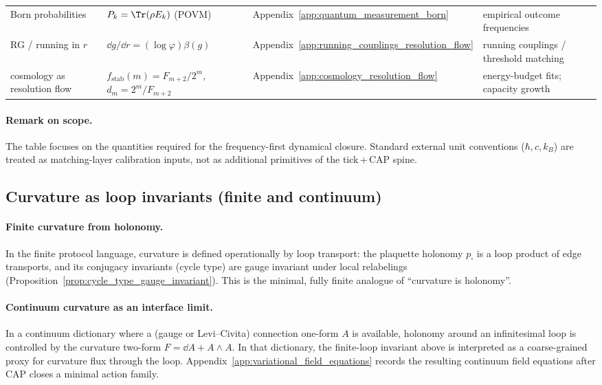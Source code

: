 \begin{longtable}{p{} p{} p{} p{}}
Born probabilities & $P_k=\Tr(\rho E_k)$ (POVM) & Appendix~\ref{app:quantum_measurement_born} & empirical outcome frequencies \\
RG / running in $r$ & $\dd g/\dd r=(\log\varphi)\beta(g)$ & Appendix~\ref{app:running_couplings_resolution_flow} & running couplings / threshold matching \\
cosmology as resolution flow & $f_{\mathrm{stab}}(m)=F_{m+2}/2^m$, $d_m=2^m/F_{m+2}$ & Appendix~\ref{app:cosmology_resolution_flow} & energy-budget fits; capacity growth \\
\bottomrule
\end{longtable}

\paragraph{Remark on scope.}
\AuditTag The table focuses on the quantities required for the frequency-first dynamical closure.
Standard external unit conventions ($\hbar,c,k_B$) are treated as matching-layer calibration inputs, not as additional primitives of the tick\,+\,CAP spine.

\subsection{Curvature as loop invariants (finite and continuum)}
\label{subsec:curvature_as_loops}

\paragraph{Finite curvature from holonomy.}
\MathTag In the finite protocol language, curvature is defined operationally by loop transport:
the plaquette holonomy $p_\square$ is a loop product of edge transports, and its conjugacy invariants (cycle type) are gauge invariant under local relabelings (Proposition~\ref{prop:cycle_type_gauge_invariant}).
This is the minimal, fully finite analogue of ``curvature is holonomy''.

\paragraph{Continuum curvature as an interface limit.}
\InterfaceTag In a continuum dictionary where a (gauge or Levi--Civita) connection one-form $A$ is available,
holonomy around an infinitesimal loop is controlled by the curvature two-form $F=\dd A+A\wedge A$.
In that dictionary, the finite-loop invariant above is interpreted as a coarse-grained proxy for curvature flux through the loop.
Appendix~\ref{app:variational_field_equations} records the resulting continuum field equations after CAP closes a minimal action family.

